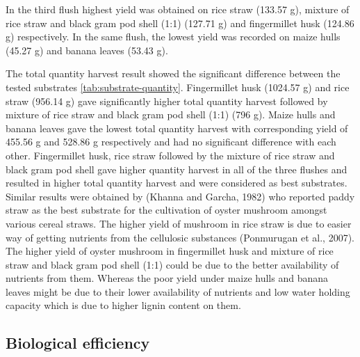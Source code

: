 \documentclass[]{elsarticle} %
\begin{document}
In the third flush highest yield was obtained on rice straw (133.57 g),
mixture of rice straw and black gram pod shell (1:1) (127.71 g) and
fingermillet husk (124.86 g) respectively. In the same flush, the lowest
yield was recorded on maize hulls (45.27 g) and banana leaves (53.43 g).

The total quantity harvest result showed the significant difference
between the tested substrates \ref{tab:substrate-quantity}. Fingermillet
husk (1024.57 g) and rice straw (956.14 g) gave significantly higher
total quantity harvest followed by mixture of rice straw and black gram
pod shell (1:1) (796 g). Maize hulls and banana leaves gave the lowest
total quantity harvest with corresponding yield of 455.56 g and 528.86 g
respectively and had no significant difference with each other.
Fingermillet husk, rice straw followed by the mixture of rice straw and
black gram pod shell gave higher quantity harvest in all of the three
flushes and resulted in higher total quantity harvest and were
considered as best substrates. Similar results were obtained by (Khanna
and Garcha, 1982) who reported paddy straw as the best substrate for the
cultivation of oyster mushroom amongst various cereal straws. The higher
yield of mushroom in rice straw is due to easier way of getting
nutrients from the cellulosic substances (Ponmurugan et al., 2007). The
higher yield of oyster mushroom in fingermillet husk and mixture of rice
straw and black gram pod shell (1:1) could be due to the better
availability of nutrients from them. Whereas the poor yield under maize
hulls and banana leaves might be due to their lower availability of
nutrients and low water holding capacity which is due to higher lignin
content on them.

\hypertarget{biological-efficiency}{%
\subsection{Biological efficiency}\label{biological-efficiency}}
\end{document}
